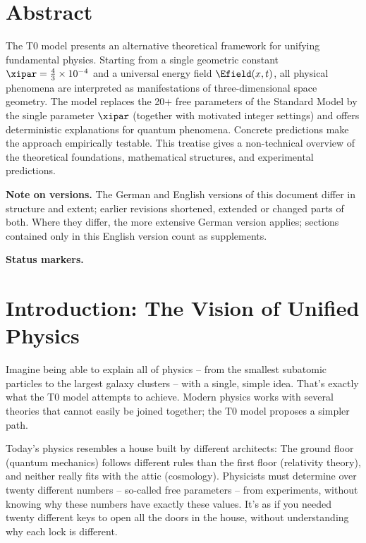 \section*{Abstract}
		\noindent The T0 model presents an alternative theoretical framework for unifying fundamental physics. Starting from a single geometric constant $\xipar = \frac{4}{3} \times 10^{-4}$ and a universal energy field $\Efield(x,t)$, all physical phenomena are interpreted as manifestations of three-dimensional space geometry. The model replaces the 20+ free parameters of the Standard Model by the single parameter $\xipar$ (together with motivated integer settings) and offers deterministic explanations for quantum phenomena. Concrete predictions make the approach empirically testable. This treatise gives a non-technical overview of the theoretical foundations, mathematical structures, and experimental predictions.

	\medskip\noindent\textbf{Note on versions.} The German and English versions of this document differ in structure and extent; earlier revisions shortened, extended or changed parts of both. Where they differ, the more extensive German version applies; sections contained only in this English version count as supplements.


	\medskip\noindent\textbf{Status markers.}
	

	

	\section{Introduction: The Vision of Unified Physics}
	
	Imagine being able to explain all of physics -- from the smallest subatomic particles to the largest galaxy clusters -- with a single, simple idea. That's exactly what the T0 model attempts to achieve. Modern physics works with several theories that cannot easily be joined together; the T0 model proposes a simpler path.
	
	Today's physics resembles a house built by different architects: The ground floor (quantum mechanics) follows different rules than the first floor (relativity theory), and neither really fits with the attic (cosmology). Physicists must determine over twenty different numbers -- so-called free parameters -- from experiments, without knowing why these numbers have exactly these values. It's as if you needed twenty different keys to open all the doors in the house, without understanding why each lock is different.
	
